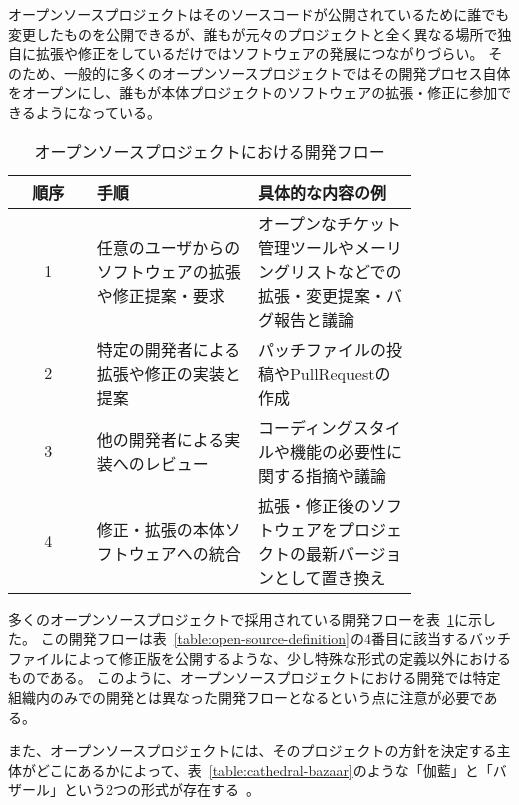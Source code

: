 オープンソースプロジェクトはそのソースコードが公開されているために誰でも変更したものを公開できるが、誰もが元々のプロジェクトと全く異なる場所で独自に拡張や修正をしているだけではソフトウェアの発展につながりづらい。
そのため、一般的に多くのオープンソースプロジェクトではその開発プロセス自体をオープンにし、誰もが本体プロジェクトのソフトウェアの拡張・修正に参加できるようになっている。

\begin{table}[!hbtp]
    \begin{center}
        \caption{オープンソースプロジェクトにおける開発フロー}
        \begin{tabular}{|c|p{0.4\linewidth}|p{0.4\linewidth}|}
            \hline
            順序 & 手順 & 具体的な内容の例 \\
            \hline
            \hline
            1 & 任意のユーザからのソフトウェアの拡張や修正提案・要求 & オープンなチケット管理ツールやメーリングリストなどでの拡張・変更提案・バグ報告と議論 \\
            \hline
            2 & 特定の開発者による拡張や修正の実装と提案 & パッチファイルの投稿やPullRequestの作成 \\
            \hline
            3 & 他の開発者による実装へのレビュー & コーディングスタイルや機能の必要性に関する指摘や議論 \\
            \hline
            4 & 修正・拡張の本体ソフトウェアへの統合 & 拡張・修正後のソフトウェアをプロジェクトの最新バージョンとして置き換え \\
            \hline
        \end{tabular}
        \label{table:open-source-flow}
    \end{center}
\end{table}

多くのオープンソースプロジェクトで採用されている開発フローを表~\ref{table:open-source-flow}に示した。
この開発フローは表~\ref{table:open-source-definition}の4番目に該当するバッチファイルによって修正版を公開するような、少し特殊な形式の定義以外におけるものである。
このように、オープンソースプロジェクトにおける開発では特定組織内のみでの開発とは異なった開発フローとなるという点に注意が必要である。

また、オープンソースプロジェクトには、そのプロジェクトの方針を決定する主体がどこにあるかによって、表~\ref{table:cathedral-bazaar}のような「伽藍」と「バザール」という2つの形式が存在する~\cite{raymond}。

